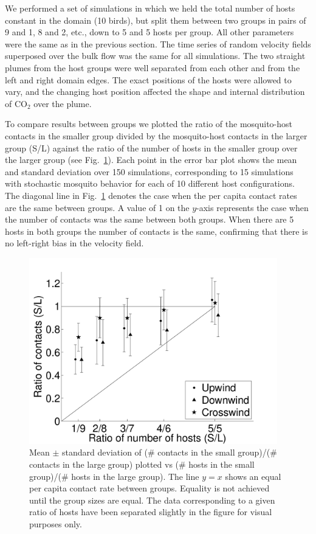 \documentclass[12pt]{article}
\newcommand{\mycaption}[1]{\caption{#1}}
\begin{document}
We performed a set of simulations in which we held the total number of hosts constant in the domain (10 birds), but split them between two groups in pairs of 9 and 1, 8 and 2, etc., down to 5 and 5 hosts per group.
All other parameters were the same as in the previous section.
The time series of random velocity fields superposed over the bulk flow was the same for all simulations. The two straight plumes from the host groups were well separated from each other and from the left and right domain edges. The exact positions of the hosts were allowed to vary, and the changing host position affected the shape and internal distribution of CO$_2$ over the plume.

To compare results between groups we plotted
the ratio of the mosquito-host contacts in the smaller group divided by the mosquito-host contacts in the larger group (S/L) against the ratio of the number of hosts in the smaller group over the larger group
(see Fig.~\ref{fig:2groupsres}). Each point in the error bar plot shows the mean and standard deviation over 150 simulations, corresponding to 15 simulations with stochastic mosquito behavior for each of 10 different host configurations. The diagonal line in Fig.~\ref{fig:2groupsres} denotes the case when the per capita contact rates are the same between groups. A value of 1 on the $y$-axis represents the case when the number of contacts was the same between both groups. When there are 5 hosts in both groups the number of contacts is the same, confirming that there is no left-right bias in the velocity field.

\begin{figure}[ht]
	\centering
	\includegraphics[width=4.25in]{figures/Results_2groups.pdf}
	\mycaption{Mean $\pm$ standard deviation of (\# contacts in the small group)/(\# contacts in the large group) plotted vs (\# hosts in the small group)/(\# hosts in the large group). The line $y=x$ shows an equal per capita contact rate between groups. Equality is not achieved until the group sizes are equal.  The data corresponding to a given ratio of hosts have been separated
	slightly in the figure for visual purposes only.}
	\label{fig:2groupsres}
\end{figure}
\end{document}
